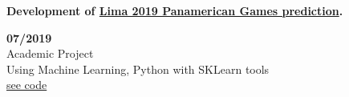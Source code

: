 \begin{minipage}{0.8\textwidth}
    \parbox{0.8\linewidth}{\textbf{Development of \hyperref[sec:panamerican]{Lima 2019 Panamerican Games prediction}.}} \hfill \textbf{07/2019}\\
    Academic Project\\
    Using Machine Learning,  Python with SKLearn tools\\
    \href{https://github.com/JavierOramas/PanamericanPredictor}{see code}\\
    \end{minipage} \hfill {}\\\\
    